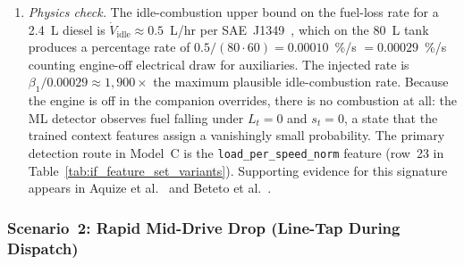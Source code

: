 \begin{enumerate}[label=\textbf{(\alph*)}, leftmargin=*]
    \item \textit{Physics check.} The idle-combustion upper bound on the fuel-loss rate for a 2.4~L diesel is $\dot{V}_{\mathrm{idle}} \approx 0.5$~L/hr per SAE~J1349~\cite{sae_j1349}, which on the 80~L tank produces a percentage rate of $0.5/(80 \cdot 60) = 0.00010$~\%/s $= 0.00029$~\%/s counting engine-off electrical draw for auxiliaries. The injected rate is $\beta_1 / 0.00029 \approx 1{,}900\times$ the maximum plausible idle-combustion rate. Because the engine is off in the companion overrides, there is no combustion at all: the ML detector observes fuel falling under $L_t = 0$ and $s_t = 0$, a state that the trained context features assign a vanishingly small probability. The primary detection route in Model~C is the \texttt{load\_per\_speed\_norm} feature (row~23 in Table~\ref{tab:if_feature_set_variants}). Supporting evidence for this signature appears in Aquize et al.~\cite{aquize2017self} and Beteto et al.~\cite{beteto2022anomaly}.
\end{enumerate}

\subsubsection{Scenario~2: Rapid Mid-Drive Drop (Line-Tap During Dispatch)}
\label{sec:inject_scenario2}

